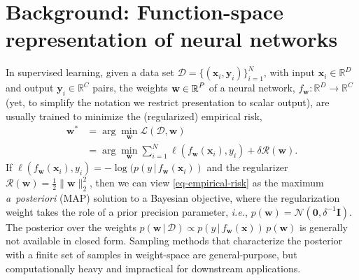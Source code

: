 \documentclass{article}
\makeatletter
\newcommand{\ie}{\textit{i.e.\@}\xspace}
\newcommand{\dataset}{\ensuremath{\mathcal{D}}}
\newcommand{\inputDomain}{\ensuremath{\mathbb{R}^{D}}}
\newcommand{\outputDomain}{\ensuremath{\mathbb{R}^{C}}}
\newcommand{\weights}{\ensuremath{\mathbf{w}}}
\newcommand{\mbf}[1]{\mathbf{#1}}
\renewcommand{\mid}{\,|\,}
\newcommand{\MI}{\mbf{I}}
\newcommand{\vzeros}{\mbf{0}}
\newcommand{\vx}{\mbf{x}}
\newcommand{\vy}{\mbf{y}}
\newcommand{\vw}{\mbf{w}}
\newcommand{\Norm}{\mathcal{N}}
\makeatother
\begin{document}
\section{Background: Function-space representation of neural networks}
\label{sec:methods}
%

%
In supervised learning, given a data set $\dataset = \{(\vx_{i} , \vy_{i})\}_{i=1}^{N}$, with input $\vx_i \in \inputDomain$ and output $\vy_i \in \outputDomain$ pairs, the weights $\weights \in \R^{P}$ of a neural network, $f_\mathbf{w}: \inputDomain \to \outputDomain$ (yet, to simplify the notation we restrict presentation to scalar output), are usually trained to minimize the (regularized) empirical risk,
%
\begin{align} \label{eq-empirical-risk}
  \weights^{*} &=
  \arg \min_{\weights} \mathcal{L}(\dataset,\weights) \nonumber \\ &=
  \arg \min_{\weights} \textstyle\sum_{i=1}^{N} \ell(f_\weights(\mathbf{x}_{i}), y_i) + \delta \mathcal{R}(\weights).
\end{align}
%
If $\ell(f_\weights(\vx_{i}), y_i) = -\log(p(y \mid f_\weights(\vx_{i}))$ and the regularizer $\mathcal{R}(\weights) = \frac{1}{2}\|\weights\|^{2}_2$, then we can view \cref{eq-empirical-risk} as the maximum {\it a~posteriori} (MAP) solution to a Bayesian objective, where the regularization weight takes the role of a prior precision parameter, \ie, $p(\vw) = \Norm(\vzeros, \delta^{-1} \MI)$.
The posterior over the weights ${p(\vw \mid \dataset) \propto p(y \mid f_{\weights}(\vx)) \, p(\weights)}$ is generally not available in closed form. Sampling methods that characterize the posterior with a finite set of samples in weight-space are general-purpose, but computationally heavy and impractical for downstream applications.
\end{document}
